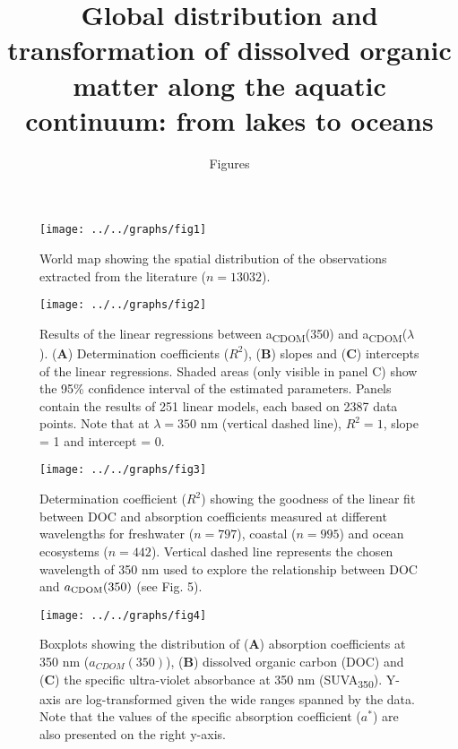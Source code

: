 \documentclass[12pt,a4paper]{scrartcl}
\title{Global distribution and transformation of dissolved organic matter along the aquatic continuum: from lakes to oceans}
\subtitle{Figures}
\date{}
\begin{document}
\maketitle

\begin{figure}[h]
	\centering
	\texttt{[image: ../../graphs/fig1]}
	\caption{World map showing the spatial distribution of the observations extracted from the literature ($n = 13032$).}
\end{figure}

\clearpage
\newpage

\begin{figure}[h]
	\centering
	\texttt{[image: ../../graphs/fig2]}
	\caption{Results of the linear regressions between a\textsubscript{CDOM}(350) and a\textsubscript{CDOM}($\lambda$). (\textbf{A}) Determination coefficients ($R^2$), (\textbf{B}) slopes and (\textbf{C}) intercepts of the linear regressions. Shaded areas (only visible in panel C) show the 95\% confidence interval of the estimated parameters. Panels contain the results of 251 linear models, each based on 2387 data points. Note that at $\lambda = 350$ nm (vertical dashed line), $R^2 = 1$, slope = 1 and intercept = 0.}
\end{figure}

\clearpage
\newpage

\begin{figure}[h]
	\centering
	\texttt{[image: ../../graphs/fig3]}
	\caption{Determination coefficient ($R^2$) showing the goodness of the linear fit between DOC and absorption coefficients measured at different wavelengths for freshwater ($n = 797$), coastal ($n = 995$) and ocean ecosystems ($n = 442$). Vertical dashed line represents the chosen wavelength of 350 nm used to explore the relationship between DOC and $a\textsubscript{CDOM}(350)$ (see Fig. 5).}
\end{figure}

\clearpage
\newpage

\begin{figure}[h]
	\centering
	\texttt{[image: ../../graphs/fig4]}
	\caption{Boxplots showing the distribution of (\textbf{A}) absorption coefficients at 350 nm ($a_{CDOM}(350)$), (\textbf{B}) dissolved organic carbon (DOC) and (\textbf{C}) the specific ultra-violet absorbance at 350 nm (SUVA\textsubscript{350}). Y-axis are log-transformed given the wide ranges spanned by the data. Note that the values of the specific absorption coefficient ($a^*$) are also presented on the right y-axis.}
\end{figure}
\end{document}
